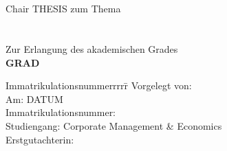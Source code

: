 \begin{titlepage}
	\begin{centering}
		\Huge \textbf{\Institution}\\[10pt]
		\Large \Programme \\[3pt]
		\Large Chair
		\vfill
		\Large THESIS zum Thema \\[13pt]
		\LARGE \textbf{\Title} \\
		\Subtitle \\[13pt]
		\Large Zur Erlangung des akademischen Grades\\
		\Large \textbf{GRAD}
		\vfill
		\vfill
		\begin{small}
			\begin{doublespace}
				\begin{tabbing}
					Immatrikulationsnummerrrrr\=\kill
					Vorgelegt von:\>\Name\\
					Am: \> DATUM\\
					Immatrikulationsnummer:\>\MatrikelNummer\\
					Studiengang:\> Corporate Management \& Economics\\
					Erstgutachterin:\>\Supervisor\\
				\end{tabbing}
			\end{doublespace}
		\end{small}
	\end{centering}\vspace{1cm}
\end{titlepage}